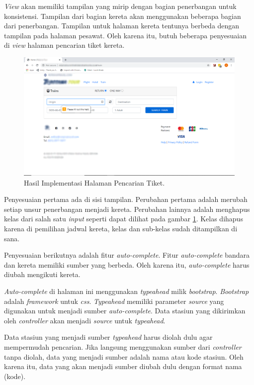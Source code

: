 \textit{View} akan memiliki tampilan yang mirip dengan bagian penerbangan untuk konsistensi. Tampilan dari bagian kereta akan menggunakan beberapa bagian dari penerbangan. Tampilan untuk halaman kereta tentunya berbeda dengan tampilan pada halaman pesawat. Oleh karena itu, butuh beberapa penyesuaian di \textit{view} halaman pencarian tiket kereta.

\begin{figure}[H]
        \center
        \includegraphics[width=\textwidth,height=\textheight,keepaspectratio]{Gambar/Search train no data pencarian tiket.png}
        \caption{Hasil Implementasi Halaman Pencarian Tiket.}
            \label{img:hasilimplementasicaritiket}
        \end{figure}

Penyesuaian pertama ada di sisi tampilan. Perubahan pertama adalah merubah setiap unsur penerbangan menjadi kereta. Perubahan lainnya adalah menghapus kelas dari salah satu \textit{input} seperti dapat dilihat pada gambar \ref{img:hasilimplementasicaritiket}. Kelas dihapus karena di pemilihan jadwal kereta, kelas dan sub-kelas sudah ditampilkan di sana.

Penyesuaian berikutnya adalah fitur \textit{auto-complete}. Fitur \textit{auto-complete} bandara dan kereta memiliki sumber yang berbeda. Oleh karena itu, \textit{auto-complete} harus diubah mengikuti kereta.

\textit{Auto-complete} di halaman ini menggunakan \textit{typeahead} milik \textit{bootstrap}. \textit{Bootstrap} adalah \textit{framework} untuk \textit{css}. \textit{Typeahead} memiliki parameter \textit{source} yang digunakan untuk menjadi sumber \textit{auto-complete}. Data stasiun yang dikirimkan oleh \textit{controller} akan menjadi \textit{source} untuk \textit{typeahead}. 

Data stasiun yang menjadi sumber \textit{typeahead} harus diolah dulu agar mempermudah pencarian. Jika langsung menggunakan sumber dari \textit{controller} tanpa diolah, data yang menjadi sumber adalah nama atau kode stasiun. Oleh karena itu, data yang akan menjadi sumber diubah dulu dengan format nama (kode).

